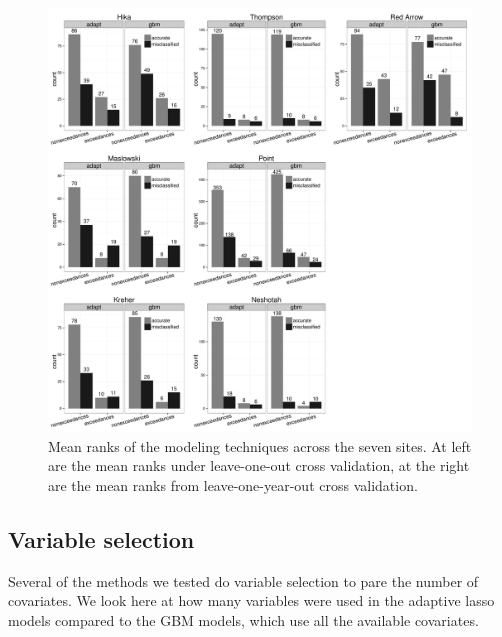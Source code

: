 \documentclass{article}\usepackage[]{graphicx}\usepackage[]{color}
\makeatletter
\def\maxwidth{ %
  \ifdim\Gin@nat@width>\linewidth
    \linewidth
  \else
    \Gin@nat@width
  \fi
}
\newenvironment{kframe}{%
 \def\at@end@of@kframe{}%
 \ifinner\ifhmode%
  \def\at@end@of@kframe{\end{minipage}}%
  \begin{minipage}{\columnwidth}%
 \fi\fi%
 \def\FrameCommand##1{\hskip\@totalleftmargin \hskip-\fboxsep
 \colorbox{shadecolor}{##1}\hskip-\fboxsep
     \hskip-\linewidth \hskip-\@totalleftmargin \hskip\columnwidth}%
 \MakeFramed {\advance\hsize-\width
   \@totalleftmargin\z@ \linewidth\hsize
   \@setminipage}}%
 {\par\unskip\endMakeFramed%
 \at@end@of@kframe}
\newenvironment{knitrout}{}{} %
\numberwithin{equation}{section}
\numberwithin{figure}{section}
\renewcommand\[{\begin{equation}}
\renewcommand\]{\end{equation}}
\makeatother
\begin{document}
\begin{knitrout}
\color{fgcolor}\begin{figure}[]

\includegraphics[width=\maxwidth]{figure/counts-barcharts} \caption[Mean ranks of the modeling techniques across the seven sites]{Mean ranks of the modeling techniques across the seven sites. At left are the mean ranks under leave-one-out cross validation, at the right are the mean ranks from leave-one-year-out cross validation.\label{fig:counts-barcharts}}
\end{figure}


\end{knitrout}


\subsection{Variable selection}

Several of the methods we tested do variable selection to pare the
number of covariates. We look here at how many variables were used
in the adaptive lasso models compared to the GBM models, which use
all the available covariates.

\begin{knitrout}
\color{fgcolor}\begin{kframe}


{\ttfamily\noindent\bfseries\color{errorcolor}{\#\# Error: error in evaluating the argument 'x' in selecting a method for function 'print': Error: object 'nvar.plot' not found}}\end{kframe}
\end{knitrout}
\end{document}

